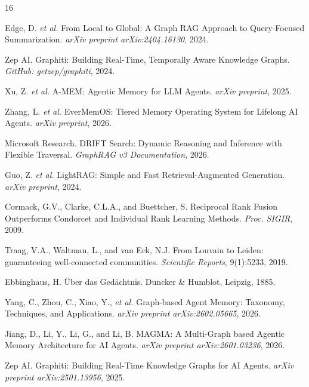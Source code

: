 \documentclass[11pt,a4paper,twocolumn]{article}
\begin{document}
\begin{thebibliography}{16}

Edge, D. \textit{et al.}
\newblock From Local to Global: A Graph RAG Approach to Query-Focused
  Summarization.
\newblock \textit{arXiv preprint arXiv:2404.16130}, 2024.

Zep AI.
\newblock Graphiti: Building Real-Time, Temporally Aware Knowledge Graphs.
\newblock \textit{GitHub: getzep/graphiti}, 2024.

Xu, Z. \textit{et al.}
\newblock A-MEM: Agentic Memory for LLM Agents.
\newblock \textit{arXiv preprint}, 2025.

Zhang, L. \textit{et al.}
\newblock EverMemOS: Tiered Memory Operating System for Lifelong AI Agents.
\newblock \textit{arXiv preprint}, 2026.

Microsoft Research.
\newblock DRIFT Search: Dynamic Reasoning and Inference with Flexible Traversal.
\newblock \textit{GraphRAG v3 Documentation}, 2026.

Guo, Z. \textit{et al.}
\newblock LightRAG: Simple and Fast Retrieval-Augmented Generation.
\newblock \textit{arXiv preprint}, 2024.

Cormack, G.V., Clarke, C.L.A., and Buettcher, S.
\newblock Reciprocal Rank Fusion Outperforms Condorcet and Individual Rank
  Learning Methods.
\newblock \textit{Proc. SIGIR}, 2009.

Traag, V.A., Waltman, L., and van Eck, N.J.
\newblock From Louvain to Leiden: guaranteeing well-connected communities.
\newblock \textit{Scientific Reports}, 9(1):5233, 2019.

Ebbinghaus, H.
\newblock \"{U}ber das Ged\"{a}chtnis.
\newblock Duncker \& Humblot, Leipzig, 1885.

Yang, C., Zhou, C., Xiao, Y., \textit{et al.}
\newblock Graph-based Agent Memory: Taxonomy, Techniques, and Applications.
\newblock \textit{arXiv preprint arXiv:2602.05665}, 2026.

Jiang, D., Li, Y., Li, G., and Li, B.
\newblock MAGMA: A Multi-Graph based Agentic Memory Architecture for AI Agents.
\newblock \textit{arXiv preprint arXiv:2601.03236}, 2026.

Zep AI.
\newblock Graphiti: Building Real-Time Knowledge Graphs for AI Agents.
\newblock \textit{arXiv preprint arXiv:2501.13956}, 2025.


\end{thebibliography}
\end{document}
